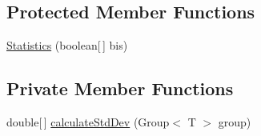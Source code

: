 \subsection*{Protected Member Functions}
\begin{DoxyCompactItemize}
\item 
\hyperlink{classjenes_1_1population_1_1_population_3_01_t_01extends_01_chromosome_01_4_1_1_statistics_3_01_t_01extends_01_chromosome_01_4_a3a0f1175b7fc029317c3d3f8337fcb84}{Statistics} (boolean\mbox{[}$\,$\mbox{]} bis)
\end{DoxyCompactItemize}
\subsection*{Private Member Functions}
\begin{DoxyCompactItemize}
\item 
double\mbox{[}$\,$\mbox{]} \hyperlink{classjenes_1_1population_1_1_population_3_01_t_01extends_01_chromosome_01_4_1_1_statistics_3_01_t_01extends_01_chromosome_01_4_a87c00eac76e3dc0740ddcc6b4b1e15ba}{calculate\-Std\-Dev} (Group$<$ T $>$ group)
\end{DoxyCompactItemize}
